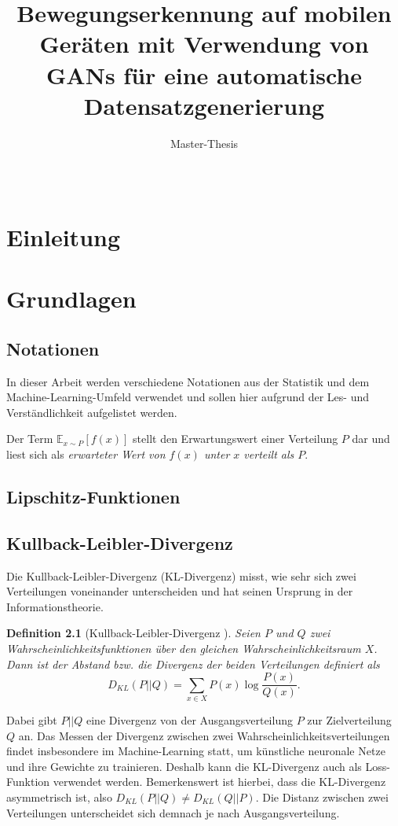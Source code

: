 \documentclass{hsflensburg}
\title{Bewegungserkennung auf mobilen Geräten mit Verwendung von GANs für eine
automatische Datensatzgenerierung}
\subtitle{Master-Thesis}
\author{
  \name{Florian Hansen}\\
  \institution{Hochschule Flensburg}
}
\newtheorem{definition}{Definition}
\begin{document}
  \maketitle
  \tableofcontents

  \chapter{Einleitung}

  \chapter{Grundlagen}
  \section{Notationen}
  In dieser Arbeit werden verschiedene Notationen aus der Statistik und dem
  Machine-Learning-Umfeld verwendet und sollen hier aufgrund der Les- und
  Verständlichkeit aufgelistet werden.

  Der Term $\mathbb{E}_{x \sim P}\left[f(x)\right]$ stellt den Erwartungswert
  einer Verteilung $P$ dar und liest sich als \textit{erwarteter Wert von
  $f(x)$ unter $x$ verteilt als $P$}.

  \section{Lipschitz-Funktionen}

  \section{Kullback-Leibler-Divergenz}
  Die Kullback-Leibler-Divergenz (KL-Divergenz) misst, wie sehr sich zwei
  Verteilungen voneinander unterscheiden und hat seinen Ursprung in der
  Informationstheorie. 
  \begin{definition}[Kullback-Leibler-Divergenz \cite{arjovsky2017wasserstein}]
    Seien $P$ und $Q$ zwei Wahrscheinlichkeitsfunktionen über den gleichen
    Wahrscheinlichkeitsraum $X$. Dann ist der Abstand bzw. die Divergenz der
    beiden Verteilungen definiert als
    \[
      D_{KL}(P \lvert\lvert Q) = \sum_{x \in X} P(x) \log \frac{P(x)}{Q(x)}.
    \]
  \end{definition}
  Dabei gibt $P \lvert\lvert Q$ eine Divergenz von der Ausgangsverteilung $P$
  zur Zielverteilung $Q$ an. Das Messen der Divergenz zwischen zwei
  Wahrscheinlichkeitsverteilungen findet insbesondere im Machine-Learning statt,
  um künstliche neuronale Netze und ihre Gewichte zu trainieren. Deshalb kann
  die KL-Divergenz auch als Loss-Funktion verwendet werden. Bemerkenswert ist
  hierbei, dass die KL-Divergenz asymmetrisch ist, also $D_{KL}(P \lvert\lvert
  Q) \neq D_{KL}(Q \lvert\lvert P)$. Die Distanz zwischen zwei Verteilungen
  unterscheidet sich demnach je nach Ausgangsverteilung.
\end{document}
